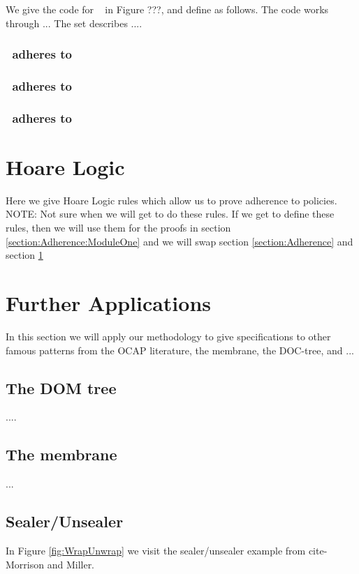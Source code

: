 \documentclass[acmsmall,screen]{acmart}
\begin{document}
We give the code for \MTwo~ in Figure ???, and define  as follows.
The code works through ...
The set   describes ....


\subsubsection{\MTwo~adheres to }

\subsubsection{\MTwo~adheres to }

\subsubsection{\MTwo~adheres to }


\section{Hoare Logic}
\label{section:Hoare}
Here we give Hoare Logic rules which allow us to prove adherence to policies.
NOTE: Not sure when we will get to do these rules. If we get to define these rules, then we will use them for the proofs
 in section \ref{section:Adherence:ModuleOne}
and we will swap section \ref{section:Adherence} and section \ref{section:Hoare}

\section{Further Applications}
In this section we will apply our methodology to give specifications to other famous patterns from the OCAP literature,
\ie the membrane, the DOC-tree, and ...

\subsection{The DOM tree}
....

\subsection{The membrane}
...

\subsection{Sealer/Unsealer}

In Figure \ref{fig:WrapUnwrap} we visit the sealer/unsealer example  from cite-Morrison and Miller.
\end{document}
